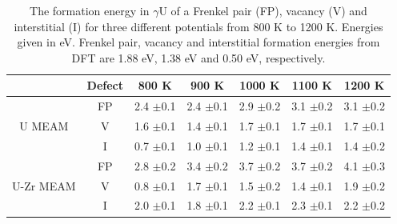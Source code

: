 \documentclass[review]{elsarticle}
\providecommand{\DIFaddtex}[1]{{\protect\color{blue} \sf #1}} %
\providecommand{\DIFaddFL}[1]{\DIFadd{#1}} %
\providecommand{\DIFaddbeginFL}{} %
\providecommand{\DIFaddendFL}{} %
\providecommand{\DIFadd}[1]{\texorpdfstring{\DIFaddtex{#1}}{#1}} %
\newcommand{\DIFaddincludegraphics}[2][]{{\color{blue}\fbox{\DIFOincludegraphics[#1]{#2}}}} %
\DeclareRobustCommand{\DIFaddbeginFL}{\DIFOaddbeginFL \let\includegraphics\DIFaddincludegraphics} %
\DeclareRobustCommand{\DIFaddendFL}{\DIFOaddendFL \let\includegraphics\DIFOincludegraphics} %
\begin{document}
\begin{table}[h]
\caption{The formation energy in $\gamma$U of a Frenkel pair (FP), vacancy (V) and interstitial (I) for three different potentials from 800 K to 1200 K. Energies given in eV. \DIFaddbeginFL \DIFaddFL{Frenkel pair, vacancy and interstitial formation energies from DFT \cite{beeler2010} are 1.88 eV, 1.38 eV and 0.50 eV, respectively. }\DIFaddendFL } \label{tab:eform}
\begin{center}
\begin{tabular}{|c|c|c|c|c|c|c|}
	\hline
			& Defect	& 800 K & 900 K & 1000 K & 1100 K & 1200 K \\
	 \hline
			& FP	 & 2.4 \DIFaddbeginFL \DIFaddFL{$\pm$0.1 }\DIFaddendFL & 2.4 \DIFaddbeginFL \DIFaddFL{$\pm$0.1 }\DIFaddendFL & 2.9 \DIFaddbeginFL \DIFaddFL{$\pm$0.2 }\DIFaddendFL & 3.1 \DIFaddbeginFL \DIFaddFL{$\pm$0.2 }\DIFaddendFL & 3.1 \DIFaddbeginFL \DIFaddFL{$\pm$0.2  }\DIFaddendFL \\
	 U MEAM 	& V	& 1.6 \DIFaddbeginFL \DIFaddFL{$\pm$0.1 }\DIFaddendFL & 1.4 \DIFaddbeginFL \DIFaddFL{$\pm$0.1 }\DIFaddendFL & 1.7 \DIFaddbeginFL \DIFaddFL{$\pm$0.1 }\DIFaddendFL & 1.7 \DIFaddbeginFL \DIFaddFL{$\pm$0.1 }\DIFaddendFL & 1.7 \DIFaddbeginFL \DIFaddFL{$\pm$0.1  }\DIFaddendFL \\
	 		& I	& 0.7 \DIFaddbeginFL \DIFaddFL{$\pm$0.1 }\DIFaddendFL & 1.0 \DIFaddbeginFL \DIFaddFL{$\pm$0.1 }\DIFaddendFL & 1.2 \DIFaddbeginFL \DIFaddFL{$\pm$0.1 }\DIFaddendFL & 1.4 \DIFaddbeginFL \DIFaddFL{$\pm$0.1 }\DIFaddendFL & 1.4 \DIFaddbeginFL \DIFaddFL{$\pm$0.2   }\DIFaddendFL \\
	\hline
	 		& FP	& 2.8 \DIFaddbeginFL \DIFaddFL{$\pm$0.2 }\DIFaddendFL & 3.4 \DIFaddbeginFL \DIFaddFL{$\pm$0.2 }\DIFaddendFL & 3.7 \DIFaddbeginFL \DIFaddFL{$\pm$0.2 }\DIFaddendFL & 3.7 \DIFaddbeginFL \DIFaddFL{$\pm$0.2 }\DIFaddendFL & 4.1 \DIFaddbeginFL \DIFaddFL{$\pm$0.3 }\DIFaddendFL \\
	 U-Zr MEAM & V & 0.8 \DIFaddbeginFL \DIFaddFL{$\pm$0.1 }\DIFaddendFL & 1.7 \DIFaddbeginFL \DIFaddFL{$\pm$0.1 }\DIFaddendFL & 1.5 \DIFaddbeginFL \DIFaddFL{$\pm$0.2 }\DIFaddendFL & 1.4 \DIFaddbeginFL \DIFaddFL{$\pm$0.1 }\DIFaddendFL & 1.9 \DIFaddbeginFL \DIFaddFL{$\pm$0.2 }\DIFaddendFL \\
			& I	& 2.0 \DIFaddbeginFL \DIFaddFL{$\pm$0.1 }\DIFaddendFL & 1.8 \DIFaddbeginFL \DIFaddFL{$\pm$0.1 }\DIFaddendFL & 2.2 \DIFaddbeginFL \DIFaddFL{$\pm$0.1 }\DIFaddendFL & 2.3 \DIFaddbeginFL \DIFaddFL{$\pm$0.1 }\DIFaddendFL & 2.2 \DIFaddbeginFL \DIFaddFL{$\pm$0.2 }\DIFaddendFL \\

\end{tabular}
\end{center}
\end{table}
\end{document}
